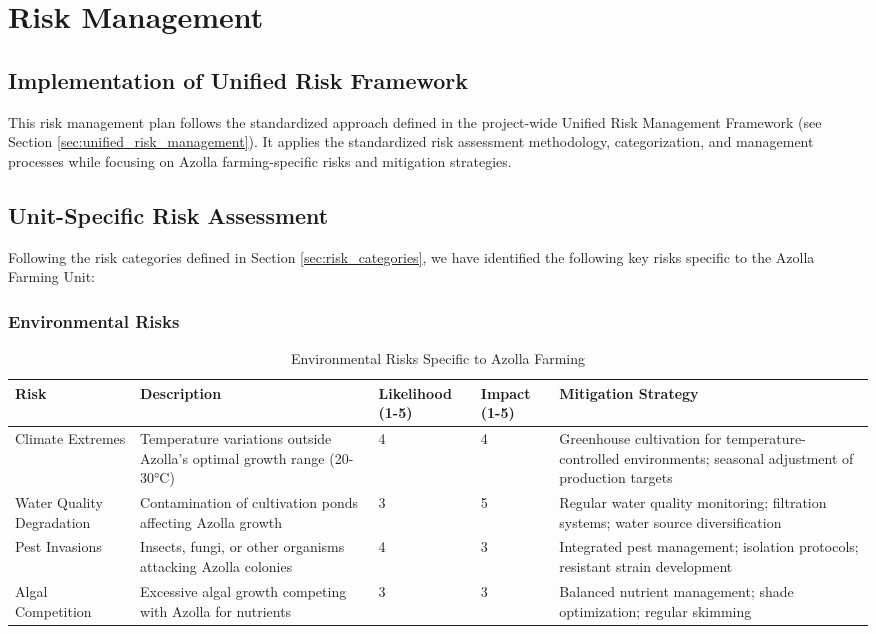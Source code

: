 \section{Risk Management}

\subsection{Implementation of Unified Risk Framework}

This risk management plan follows the standardized approach defined in the project-wide Unified Risk Management Framework (see Section \ref{sec:unified_risk_management}). It applies the standardized risk assessment methodology, categorization, and management processes while focusing on Azolla farming-specific risks and mitigation strategies.

\subsection{Unit-Specific Risk Assessment}

Following the risk categories defined in Section \ref{sec:risk_categories}, we have identified the following key risks specific to the Azolla Farming Unit:

\subsubsection{Environmental Risks}

\begin{table}[h]
\centering
\begin{tabular}{|p{3cm}|p{3cm}|p{2cm}|p{2cm}|p{4cm}|}
\hline
\textbf{Risk} & \textbf{Description} & \textbf{Likelihood (1-5)} & \textbf{Impact (1-5)} & \textbf{Mitigation Strategy} \\
\hline
Climate Extremes & Temperature variations outside Azolla's optimal growth range (20-30°C) & 4 & 4 & Greenhouse cultivation for temperature-controlled environments; seasonal adjustment of production targets \\
\hline
Water Quality Degradation & Contamination of cultivation ponds affecting Azolla growth & 3 & 5 & Regular water quality monitoring; filtration systems; water source diversification \\
\hline
Pest Invasions & Insects, fungi, or other organisms attacking Azolla colonies & 4 & 3 & Integrated pest management; isolation protocols; resistant strain development \\
\hline
Algal Competition & Excessive algal growth competing with Azolla for nutrients & 3 & 3 & Balanced nutrient management; shade optimization; regular skimming \\
\hline
\end{tabular}
\caption{Environmental Risks Specific to Azolla Farming}
\end{table}

